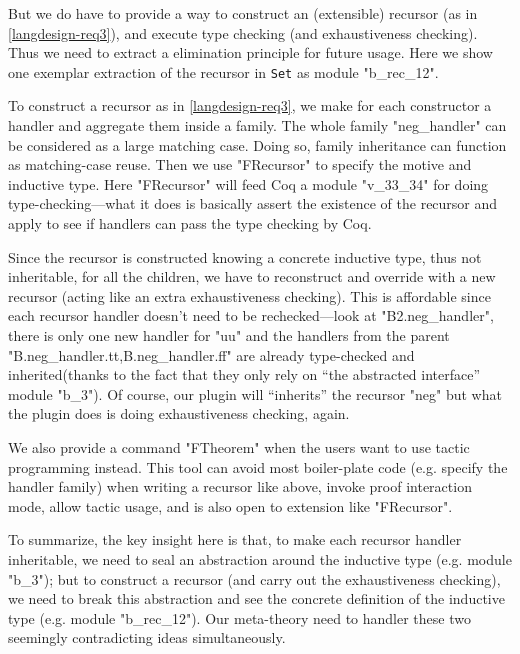 But we do have to provide a way to construct an (extensible) recursor (as in \ref{langdesign-req3}), and execute type checking (and exhaustiveness checking). Thus we need to extract a elimination principle for future usage. Here we show one exemplar extraction of the recursor in \texttt{Set} as module "b_rec_12".

To construct a recursor as in \ref{langdesign-req3}, we make for each constructor a handler and aggregate them inside a family. The whole family "neg_handler" can be considered as a large matching case. Doing so, family inheritance can function as matching-case reuse. Then we use "FRecursor" to specify the motive and inductive type. Here "FRecursor" will feed Coq
a module "v_33_34" for doing type-checking---what it does is basically assert the existence of the recursor and apply to see if handlers can pass the type checking by Coq. 

Since the recursor is constructed knowing a concrete inductive type, thus not inheritable, for all the children, we have to reconstruct and override with a new recursor (acting like an extra exhaustiveness checking). This is affordable since each recursor handler doesn't need to be rechecked---look at "B2.neg_handler", there is only one new handler for "uu" and the handlers from the parent "B.neg_handler.tt,B.neg_handler.ff" are already type-checked and inherited(thanks to the fact that they only rely on ``the abstracted interface'' module "b_3"). Of course, our plugin will ``inherits'' the recursor "neg" but what the plugin does is doing exhaustiveness checking, again.



We also provide a command "FTheorem" when the users want to use tactic programming instead. This tool can avoid most boiler-plate code (e.g. specify the handler family) when writing a recursor like above, invoke proof interaction mode, allow tactic usage, and is also open to extension like "FRecursor".

To summarize, the key insight here is that, to make each recursor handler inheritable, we need to seal an abstraction around the inductive type (e.g. module "b_3"); but to construct a recursor (and carry out the exhaustiveness checking), we need to break this abstraction and see the concrete definition of the inductive type (e.g. module "b_rec_12"). Our meta-theory need to handler these two seemingly contradicting ideas simultaneously. 


